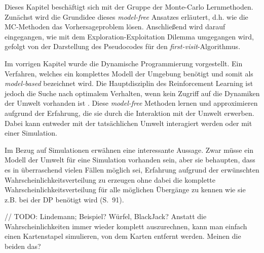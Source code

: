 Dieses Kapitel beschäftigt sich mit der Gruppe der Monte-Carlo Lernmethoden. Zunächst wird die Grundidee dieses \textit{model-free} Ansatzes erläutert, d.h. wie die MC-Methoden das Vorhersageproblem lösen. Anschließend wird darauf eingegangen, wie mit dem Exploration-Exploitation Dilemma umgegangen wird, gefolgt von der Darstellung des Pseudocodes für den \textit{first-visit}-Algorithmus.
\par 

Im vorrigen Kapitel wurde die Dynamische Programmierung vorgestellt. Ein Verfahren, welches ein komplettes Modell der Umgebung benötigt und somit als \textit{model-based} bezeichnet wird. Die Hauptdisziplin des Reinforcement Learning ist jedoch die Suche nach optimalem Verhalten, wenn kein Zugriff auf die Dynamiken der Umwelt vorhanden ist \cite[S.~27]{Wiering}. Diese \textit{model-free} Methoden lernen und approximieren aufgrund der Erfahrung, die sie durch die Interaktion mit der Umwelt erwerben. Dabei kann entweder mit der tatsächlichen Umwelt interagiert werden oder mit einer Simulation.
\par 
Im Bezug auf Simulationen erwähnen \cite{Sutton1998} eine interessante Aussage. Zwar müsse ein Modell der Umwelt für eine Simulation vorhanden sein, aber sie behaupten, dass es in überraschend vielen Fällen möglich sei, Erfahrung aufgrund der erwünschten Wahrscheinlichkeitsverteilung zu erzeugen ohne dabei die komplette Wahrscheinlichkeitsverteilung für alle möglichen Übergänge zu kennen wie sie z.B. bei der DP benötigt wird (S.~91).
\par 
// TODO: Lindemann; Beispiel? Würfel, BlackJack? Anstatt die Wahrscheinlichkeiten immer wieder komplett auszurechnen, kann man einfach einen Kartenstapel simulieren, von dem Karten entfernt werden. Meinen die beiden das?
\par 

